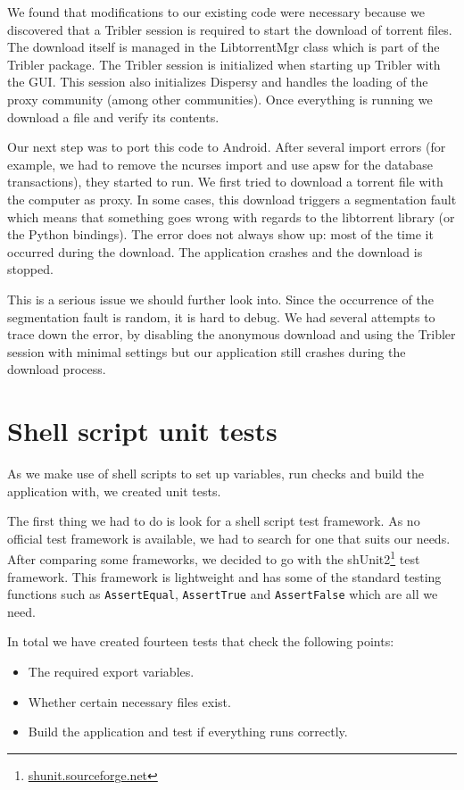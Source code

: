 	We found that modifications to our existing code were necessary because we discovered that a Tribler session is required to start the download of torrent files. The download itself is managed in the LibtorrentMgr class which is part of the Tribler package. The Tribler session is initialized when starting up Tribler with the GUI. This session also initializes Dispersy and handles the loading of the proxy community (among other communities). Once everything is running we download a file and verify its contents.
	
	Our next step was to port this code to Android. After several import errors (for example, we had to remove the ncurses import and use apsw for the database transactions), they started to run. We first tried to download a torrent file with the computer as proxy. In some cases, this download triggers a segmentation fault which means that something goes wrong with regards to the libtorrent library (or the Python bindings). The error does not always show up: most of the time it occurred during the download. The application crashes and the download is stopped.
	
	This is a serious issue we should further look into. Since the occurrence of the segmentation fault is random, it is hard to debug. We had several attempts to trace down the error, by disabling the anonymous download and using the Tribler session with minimal settings but our application still crashes during the download process.

	\section{Shell script unit tests}
		As we make use of shell scripts to set up variables, run checks and build the application with, we created unit tests.
		
		The first thing we had to do is look for a shell script test framework. As no official test framework is available, we had to search for one that suits our needs. After comparing some frameworks, we decided to go with the shUnit2\footnote{\href{http://shunit.sourceforge.net}{shunit.sourceforge.net}} test framework. This framework is lightweight and has some of the standard testing functions such as \texttt{AssertEqual}, \texttt{AssertTrue} and \texttt{AssertFalse} which are all we need. 
		
		In total we have created fourteen tests that check the following points:
		
		\begin{itemize}
			\item The required export variables.
			\item Whether certain necessary files exist.
			\item Build the application and test if everything runs correctly.
		\end{itemize}
		
